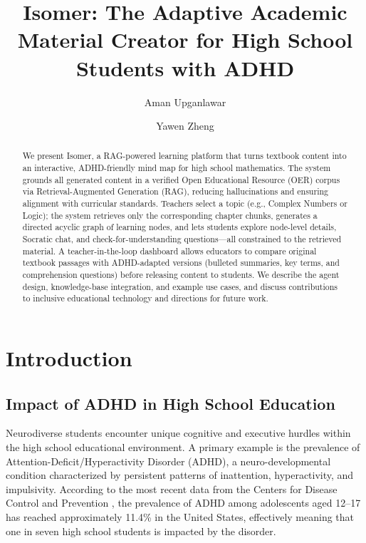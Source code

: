 \documentclass[sigplan,screen]{acmart}
\begin{document}
\title{Isomer: The Adaptive Academic Material Creator for High School Students with ADHD}

\author{Aman Upganlawar}

\author{Yawen Zheng}

\begin{abstract}
We present Isomer, a RAG-powered learning platform that turns textbook content into an interactive, ADHD-friendly mind map for high school mathematics. The system grounds all generated content in a verified Open Educational Resource (OER) corpus via Retrieval-Augmented Generation (RAG), reducing hallucinations and ensuring alignment with curricular standards. Teachers select a topic (e.g., Complex Numbers or Logic); the system retrieves only the corresponding chapter chunks, generates a directed acyclic graph of learning nodes, and lets students explore node-level details, Socratic chat, and check-for-understanding questions—all constrained to the retrieved material. A teacher-in-the-loop dashboard allows educators to compare original textbook passages with ADHD-adapted versions (bulleted summaries, key terms, and comprehension questions) before releasing content to students. We describe the agent design, knowledge-base integration, and example use cases, and discuss contributions to inclusive educational technology and directions for future work.
\end{abstract}


\maketitle

\section{Introduction}

\subsection{Impact of ADHD in High School Education}
Neurodiverse students encounter unique cognitive and executive hurdles within the high school educational environment. A primary example is the prevalence of Attention-Deficit/Hyperactivity Disorder (ADHD), a neuro-developmental condition characterized by persistent patterns of inattention, hyperactivity, and impulsivity. According to the most recent data from the Centers for Disease Control and Prevention \cite{cdc2024adhd}, the prevalence of ADHD among adolescents aged 12--17 has reached approximately 11.4\% in the United States, effectively meaning that one in seven high school students is impacted by the disorder.
\end{document}
